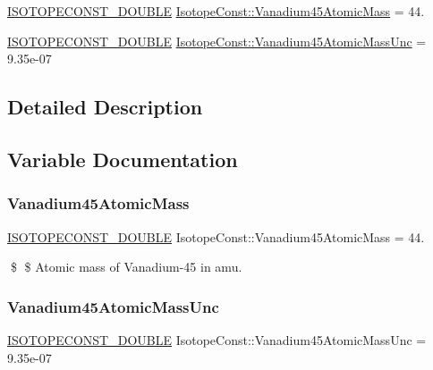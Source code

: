 \begin{DoxyCompactItemize}
\item 
\mbox{\hyperlink{group___isotope_const-_macros_ga8f45a7272ce02c0b4c65c44636ed719a}{I\+S\+O\+T\+O\+P\+E\+C\+O\+N\+S\+T\+\_\+\+D\+O\+U\+B\+LE}} \mbox{\hyperlink{group___isotope_const-_vanadium-_v45_gacd4930bb59252a4c443c7effe80c7822}{Isotope\+Const\+::\+Vanadium45\+Atomic\+Mass}} = 44.
\item 
\mbox{\hyperlink{group___isotope_const-_macros_ga8f45a7272ce02c0b4c65c44636ed719a}{I\+S\+O\+T\+O\+P\+E\+C\+O\+N\+S\+T\+\_\+\+D\+O\+U\+B\+LE}} \mbox{\hyperlink{group___isotope_const-_vanadium-_v45_gab9432b9ed0b67a20bca6ffad7f9fe781}{Isotope\+Const\+::\+Vanadium45\+Atomic\+Mass\+Unc}} = 9.\+35e-\/07
\end{DoxyCompactItemize}


\subsection{Detailed Description}


\subsection{Variable Documentation}
\mbox{\label{group___isotope_const-_vanadium-_v45_gacd4930bb59252a4c443c7effe80c7822}} 
\subsubsection{\texorpdfstring{Vanadium45\+Atomic\+Mass}{Vanadium45AtomicMass}}
{\footnotesize\ttfamily \mbox{\hyperlink{group___isotope_const-_macros_ga8f45a7272ce02c0b4c65c44636ed719a}{I\+S\+O\+T\+O\+P\+E\+C\+O\+N\+S\+T\+\_\+\+D\+O\+U\+B\+LE}} Isotope\+Const\+::\+Vanadium45\+Atomic\+Mass = 44.}

\$ \$ Atomic mass of Vanadium-\/45 in amu. \mbox{\label{group___isotope_const-_vanadium-_v45_gab9432b9ed0b67a20bca6ffad7f9fe781}} 
\subsubsection{\texorpdfstring{Vanadium45\+Atomic\+Mass\+Unc}{Vanadium45AtomicMassUnc}}
{\footnotesize\ttfamily \mbox{\hyperlink{group___isotope_const-_macros_ga8f45a7272ce02c0b4c65c44636ed719a}{I\+S\+O\+T\+O\+P\+E\+C\+O\+N\+S\+T\+\_\+\+D\+O\+U\+B\+LE}} Isotope\+Const\+::\+Vanadium45\+Atomic\+Mass\+Unc = 9.\+35e-\/07}

